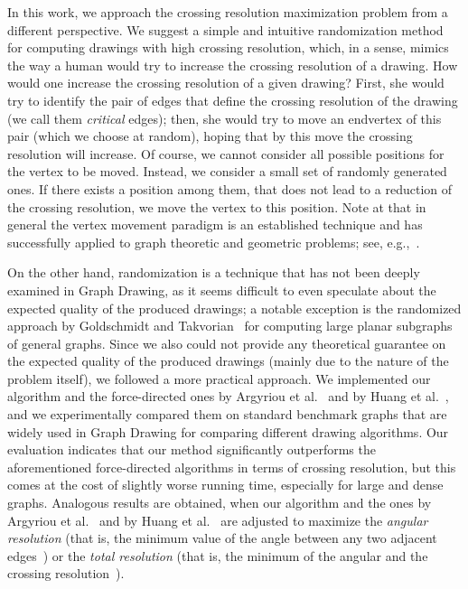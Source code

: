 \documentclass{comjnl}
\begin{document}
In this work, we approach the crossing resolution maximization problem from a different perspective. We suggest a simple and intuitive randomization method for computing drawings with high crossing resolution, which, in a sense, mimics the way a human would try to increase the crossing resolution of a drawing. How would one increase the crossing resolution of a given drawing? First, she would try to identify the pair of edges that define the crossing resolution of the drawing (we call them \emph{critical} edges); then, she would try to move an endvertex of this pair (which we choose at random), hoping that by this move the crossing resolution will increase. Of course, we cannot consider all possible positions for the vertex to be moved. Instead, we consider a small set of randomly generated ones. If there exists a position among them, that does not lead to a reduction of the crossing resolution, we move the vertex to this position. Note at that in general the vertex movement paradigm is an established technique and has successfully applied to graph theoretic and geometric problems; see, e.g.,~\cite{DBLP:conf/sofsem/BlasiusRR17,DBLP:conf/dac/FiducciaM82,6771089,DBLP:conf/alenex/RadermacherRRW18,DBLP:conf/wsdm/UganderB13}.

On the other hand, randomization is a technique that has not been deeply examined in Graph Drawing, as it seems difficult to even speculate about the expected quality of the produced drawings; a notable exception is the randomized approach by Goldschmidt and Takvorian~\cite{DBLP:journals/networks/GoldschmidtT94} for computing large planar subgraphs of general graphs. Since we also could not provide any theoretical guarantee on the expected quality of the produced drawings (mainly due to the nature of the problem itself), we followed a more practical approach. We implemented our algorithm and the force-directed ones by Argyriou et al.~\cite{DBLP:journals/cj/ArgyriouBS13} and by Huang et al.~\cite{DBLP:journals/vlc/HuangEHL13}, and we experimentally compared them on standard benchmark graphs that are widely used in Graph Drawing for comparing different drawing algorithms. Our evaluation indicates that our method significantly outperforms the aforementioned force-directed algorithms in terms of crossing resolution, but this comes at the cost of slightly worse running time, especially for large and dense graphs. Analogous results are obtained, when our algorithm and the ones by Argyriou et al.~\cite{DBLP:journals/cj/ArgyriouBS13} and by Huang et al.~\cite{DBLP:journals/vlc/HuangEHL13} are adjusted to maximize the \emph{angular resolution} (that is, the minimum value of the angle between any two adjacent edges~\cite{DBLP:journals/siamcomp/FormannHHKLSWW93}) or the \emph{total resolution} (that is, the minimum of the angular and the crossing resolution~\cite{DBLP:journals/cj/ArgyriouBS13}).
\end{document}
